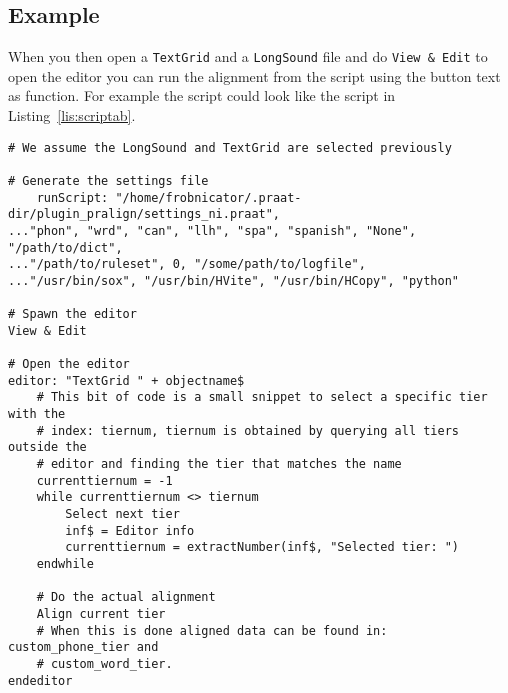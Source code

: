 \subsection{Example}
When you then open a \texttt{TextGrid} and a \texttt{LongSound} file and do
\texttt{View \& Edit} to open the editor you can run the alignment from the
script using the button text as function. For example the script could look
like the script in Listing~\ref{lis:scriptab}.

\begin{lstlisting}[caption={Example scriptability},label={lis:scriptab}]
# We assume the LongSound and TextGrid are selected previously

# Generate the settings file
	runScript: "/home/frobnicator/.praat-dir/plugin_pralign/settings_ni.praat",
..."phon", "wrd", "can", "llh", "spa", "spanish", "None", "/path/to/dict",
..."/path/to/ruleset", 0, "/some/path/to/logfile",
..."/usr/bin/sox", "/usr/bin/HVite", "/usr/bin/HCopy", "python"

# Spawn the editor
View & Edit

# Open the editor
editor: "TextGrid " + objectname$
	# This bit of code is a small snippet to select a specific tier with the
	# index: tiernum, tiernum is obtained by querying all tiers outside the
	# editor and finding the tier that matches the name
	currenttiernum = -1
	while currenttiernum <> tiernum
		Select next tier
		inf$ = Editor info
		currenttiernum = extractNumber(inf$, "Selected tier: ")
	endwhile
	
	# Do the actual alignment
	Align current tier
	# When this is done aligned data can be found in: custom_phone_tier and 
	# custom_word_tier.
endeditor
\end{lstlisting}

